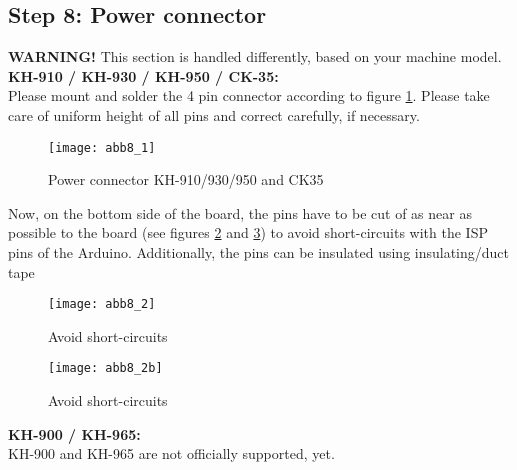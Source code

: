 \documentclass[fleqn,10pt]{SelfArx} %
\begin{document}
\FloatBarrier

 \subsection*{Step 8: Power connector}

\textbf{WARNING!} This section is handled differently, based on your machine model.\\

\textbf{KH-910 / KH-930 / KH-950 / CK-35:} \\

Please mount and solder the 4 pin connector according to figure \ref{fig:abb8_1}. Please take care of uniform height of all pins and correct carefully, if necessary.

\begin{figure}[tbhp]\centering
\texttt{[image: abb8\_1]}
\caption{Power connector KH-910/930/950 and CK35}
\label{fig:abb8_1}
\end{figure}

Now, on the bottom side of the board, the pins have to be cut of as near as possible to the board (see figures \ref{fig:abb8_2} and \ref{fig:abb8_2b}) to avoid short-circuits with the ISP pins of the Arduino. Additionally, the pins can be insulated using insulating/duct tape\par

\begin{figure}[tbhp]\centering
\texttt{[image: abb8\_2]}
\caption{Avoid short-circuits}
\label{fig:abb8_2}
\end{figure}

\begin{figure}[tbhp]\centering
\texttt{[image: abb8\_2b]}
\caption{Avoid short-circuits}
\label{fig:abb8_2b}
\end{figure}

\FloatBarrier

\textbf{KH-900 / KH-965:} \\

KH-900 and KH-965 are not officially supported, yet.
\end{document}

